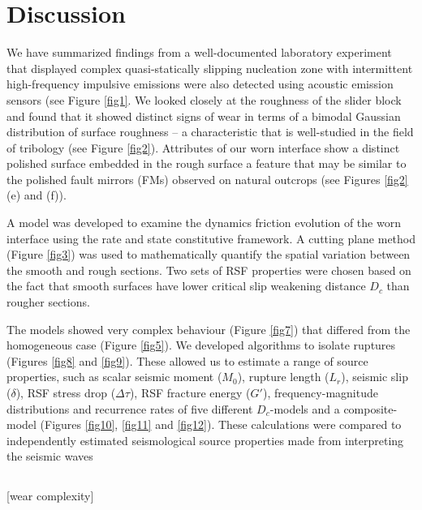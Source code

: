 \documentclass[final,3p, 11pt,authoryear]{elsarticle}
\begin{document}
\section{Discussion}
We have summarized findings from a well-documented laboratory experiment \citep{Selvadurai2015, Selvadurai2017, Selvadurai2019} that displayed complex quasi-statically slipping nucleation zone with intermittent high-frequency impulsive emissions were also detected using acoustic emission sensors (see Figure \ref{fig1}. We looked closely at the roughness of the slider block and found that it showed distinct signs of wear in terms of a bimodal Gaussian distribution of surface roughness -- a characteristic that is well-studied in the field of tribology (see Figure \ref{fig2}). Attributes of our worn interface show a distinct polished surface embedded in the rough surface a feature that may be similar to the polished fault mirrors (FMs) observed on natural outcrops (see Figures \ref{fig2}(e) and (f)).

A model was developed to examine the dynamics friction evolution of the worn interface using the rate and state constitutive framework. A cutting plane method (Figure \ref{fig3}) was used to mathematically quantify the spatial variation between the smooth and rough sections. Two sets of RSF properties were chosen based on the fact that smooth surfaces have lower critical slip weakening distance $D_{c}$ than rougher sections.  

The models showed very complex behaviour (Figure \ref{fig7}) that differed from the homogeneous case (Figure \ref{fig5}).  We developed algorithms to isolate ruptures (Figures \ref{fig8} and \ref{fig9}).  These allowed us to estimate a range of source properties, such as scalar seismic moment ($M_{0}$), rupture length ($L_{r}$), seismic slip ($\delta$), RSF stress drop ($\Delta\tau$), RSF fracture energy ($G'$), frequency-magnitude distributions and recurrence rates of five different $D_{c}$-models and a composite-model (Figures \ref{fig10}, \ref{fig11} and \ref{fig12}). These calculations were compared to independently estimated seismological source properties made from interpreting the seismic waves \citep{Selvadurai2019}

\subsection{}
[wear complexity]
\end{document}
